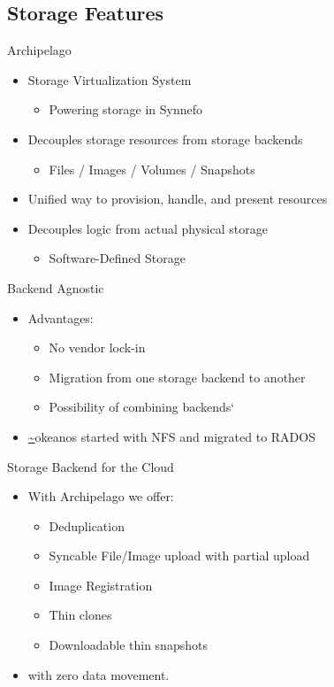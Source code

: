 \documentclass[utf8]{beamer}
\newcommand{\okeanos}{\url{~}okeanos}
\begin{document}
\subsection{Storage Features}

\begin{frame}{Archipelago}
  \begin{itemize}
    \item Storage Virtualization System
      \begin{itemize}
        \item Powering storage in Synnefo
      \end{itemize}
    \item Decouples storage resources from storage backends
      \begin{itemize}
        \item Files / Images / Volumes / Snapshots
      \end{itemize}
    \item Unified way to provision, handle, and present resources
    \item Decouples logic from actual physical storage
      \begin{itemize}
        \item Software-Defined Storage
      \end{itemize}
  \end{itemize}
\end{frame}

\begin{frame}{Backend Agnostic}
  \begin{itemize}
    \item Advantages:
      \begin{itemize}
      \item No vendor lock-in
      \item Migration from one storage backend to another
      \item Possibility of combining backends`
    \end{itemize}
    \item \okeanos{} started with NFS and migrated to RADOS
  \end{itemize}
\end{frame}

\begin{frame}{Storage Backend for the Cloud}
  \begin{itemize}
  \item With Archipelago we offer:
    \begin{itemize}
      \item Deduplication
      \item Syncable File/Image upload with partial upload
      \item Image Registration
      \item Thin clones
      \item Downloadable thin snapshots
    \end{itemize}
  \item with zero data movement.
  \end{itemize}
\end{frame}
\end{document}
